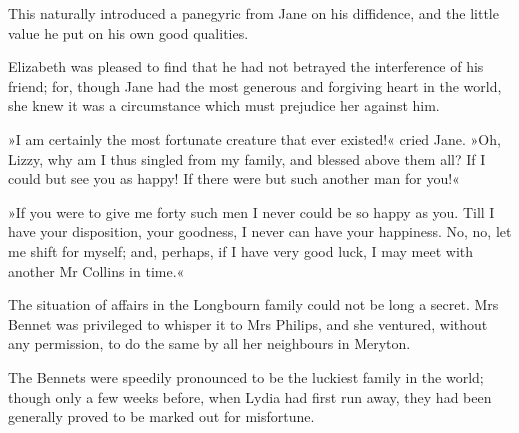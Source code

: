 This naturally introduced a panegyric from Jane on his diffidence, and the little value he put on his own good qualities.

Elizabeth was pleased to find that he had not betrayed the interference of his friend; for, though Jane had the most generous and forgiving heart in the world, she knew it was a circumstance which must prejudice her against him.

»I am certainly the most fortunate creature that ever existed!« cried Jane. »Oh, Lizzy, why am I thus singled from my family, and blessed above them all? If I could but see you as happy! If there were but such another man for you!«

»If you were to give me forty such men I never could be so happy as you. Till I have your disposition, your goodness, I never can have your happiness. No, no, let me shift for myself; and, perhaps, if I have very good luck, I may meet with another Mr Collins in time.«

The situation of affairs in the Longbourn family could not be long a secret. Mrs Bennet was privileged to whisper it to Mrs Philips, and she ventured, without any permission, to do the same by all her neighbours in Meryton.

The Bennets were speedily pronounced to be the luckiest family in the world; though only a few weeks before, when Lydia had first run away, they had been generally proved to be marked out for misfortune.